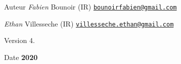 \begin{DoxyAuthor}{Auteur}
{\itshape Fabien} Bounoir (IR) \href{mailto:bounoirfabien@gmail.com}{\tt bounoirfabien@gmail.\+com} 

{\itshape Ethan} Villesseche (IR) \href{mailto:villesseche.ethan@gmail.com}{\tt villesseche.\+ethan@gmail.\+com} 
\end{DoxyAuthor}
\begin{DoxyVersion}{Version}
4. 
\end{DoxyVersion}
\begin{DoxyDate}{Date}
{\bfseries 2020} 
\end{DoxyDate}
